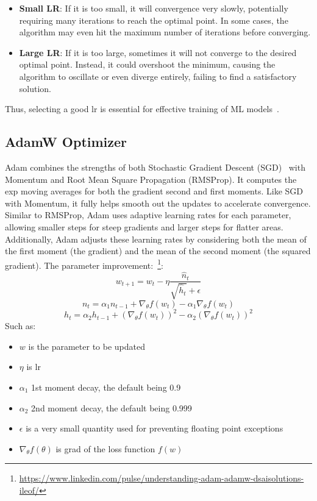 \documentclass[12pt,a4paper]{report}
\begin{document}
\begin{itemize}
  \item \textbf{Small LR}: If it is too small, it will convergence very slowly, potentially requiring many iterations to reach the optimal point. In some cases, the algorithm may even hit the maximum number of iterations before converging.
  \item \textbf{Large LR}: If it is too large, sometimes it will not converge to the desired optimal point. Instead, it could overshoot the minimum, causing the algorithm to oscillate or even diverge entirely, failing to find a satisfactory solution.
\end{itemize}

Thus, selecting a good lr is essential for effective training of ML models~\cite{gradientdescent}.

\subsection{AdamW Optimizer}

Adam combines the strengths of both Stochastic Gradient Descent (SGD)~\cite{bottou2012stochastic} with Momentum and Root Mean Square Propagation (RMSProp). It computes the exp moving averages for both the gradient second and first moments. Like SGD with Momentum, it fully helps smooth out the updates to accelerate convergence. Similar to RMSProp, Adam uses adaptive learning rates for each parameter, allowing smaller steps for steep gradients and larger steps for flatter areas. Additionally, Adam adjusts these learning rates by considering both the mean of the first moment (the gradient) and the mean of the second moment (the squared gradient). The parameter improvement:~\footnote{\url{https://www.linkedin.com/pulse/understanding-adam-adamw-dsaisolutions-ileof/}}:
\begin{equation}
  w_{t+1} = w_t - \eta \frac{\hat{n}_t}{\sqrt{\hat{h}_t} + \epsilon}
\end{equation}
\begin{equation}
  n_t = \alpha_1 n_{t-1} + \nabla_\theta f(w_t) - \alpha_1\nabla_\theta f(w_t)
\end{equation}
\begin{equation}
  h_t = \alpha_2 h_{t-1} + (\nabla_\theta f(w_t))^2 - \alpha_2(\nabla_\theta f(w_t))^2
\end{equation}
Such as:

\begin{itemize}
  \item \(w\) is the parameter to be updated
  \item \(\eta\) is lr
  \item \(\alpha_1\) 1st moment decay, the default being 0.9
  \item \(\alpha_2\) 2nd moment decay, the default being 0.999
  \item \(\epsilon\) is a very small quantity used for preventing floating point exceptions
  \item \(\nabla_\theta f(\theta)\) is grad of the loss function \(f(w)\)
\end{itemize}
\end{document}
